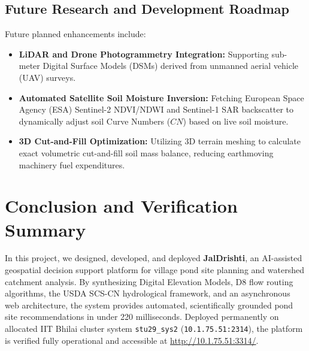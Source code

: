 \documentclass[11pt,a4paper]{article}
\begin{document}
\subsection{Future Research and Development Roadmap}
Future planned enhancements include:
\begin{itemize}[noitemsep,topsep=2pt]
    \item \textbf{LiDAR and Drone Photogrammetry Integration:} Supporting sub-meter Digital Surface Models (DSMs) derived from unmanned aerial vehicle (UAV) surveys.
    \item \textbf{Automated Satellite Soil Moisture Inversion:} Fetching European Space Agency (ESA) Sentinel-2 NDVI/NDWI and Sentinel-1 SAR backscatter to dynamically adjust soil Curve Numbers ($CN$) based on live soil moisture.
    \item \textbf{3D Cut-and-Fill Optimization:} Utilizing 3D terrain meshing to calculate exact volumetric cut-and-fill soil mass balance, reducing earthmoving machinery fuel expenditures.
\end{itemize}

\section{Conclusion and Verification Summary}
\label{sec:conclusion}
In this project, we designed, developed, and deployed \textbf{JalDrishti}, an AI-assisted geospatial decision support platform for village pond site planning and watershed catchment analysis. By synthesizing Digital Elevation Models, D8 flow routing algorithms, the USDA SCS-CN hydrological framework, and an asynchronous web architecture, the system provides automated, scientifically grounded pond site recommendations in under 220 milliseconds. Deployed permanently on allocated IIT Bhilai cluster system \texttt{stu29\_sys2} (\texttt{10.1.75.51:2314}), the platform is verified fully operational and accessible at \url{http://10.1.75.51:3314/}.
\end{document}
